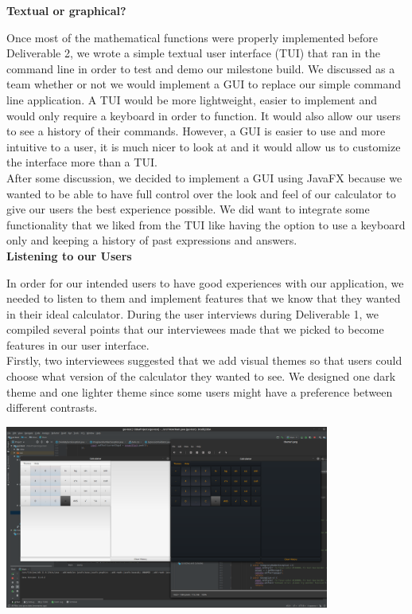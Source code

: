 \documentclass[a4paper, 12pt]{article}
\begin{document}
\textbf{Textual or graphical?}

Once most of the mathematical functions were properly implemented before Deliverable 2, we wrote a simple textual user interface (TUI) that ran in the command line in order to test and demo our milestone build. We discussed as a team whether or not we would implement a GUI to replace our simple command line application. A TUI would be more lightweight, easier to implement and would only require a keyboard in order to function. It would also allow our users to see a history of their commands. However, a GUI is easier to use and more intuitive to a user, it is much nicer to look at and it would allow us to customize the interface more than a TUI. 
\\

After some discussion, we decided to implement a GUI using JavaFX because we wanted to be able to have full control over the look and feel of our calculator to give our users the best experience possible. We did want to integrate some functionality that we liked from the TUI like having the option to use a keyboard only and keeping a history of past expressions and answers.
\\

\textbf{Listening to our Users}

In order for our intended users to have good experiences with our application, we needed to listen to them and implement features that we know that they wanted in their ideal calculator. 
During the user interviews during Deliverable 1, we compiled several points that our interviewees made that we picked to become features in our user interface. 
\\

Firstly, two interviewees suggested that we add visual themes so that users could choose what version of the calculator they wanted to see. We designed one dark theme and one lighter theme since some users might have a preference between different contrasts. 

\vspace{5mm}

\includegraphics[width=0.80\textwidth]{themes.png}
\end{document}
